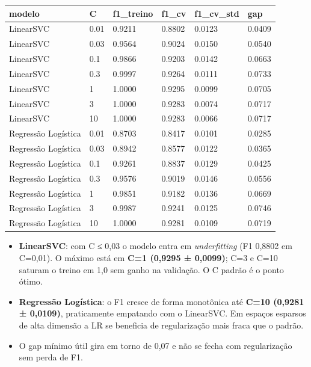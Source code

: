 \documentclass[
  brazilian,
  11pt,
]{article}
\newcounter{none} %
\providecommand{\tightlist}{%
  \setlength{\itemsep}{0pt}\setlength{\parskip}{0pt}}
\begin{document}
{\def\LTcaptype{none} %
\begin{longtable}[]{@{}llllll@{}}
\toprule\noalign{}
modelo & C & f1\_treino & f1\_cv & f1\_cv\_std & gap \\
\midrule\noalign{}
\endhead
\bottomrule\noalign{}
\endlastfoot
LinearSVC & 0.01 & 0.9211 & 0.8802 & 0.0123 & 0.0409 \\
LinearSVC & 0.03 & 0.9564 & 0.9024 & 0.0150 & 0.0540 \\
LinearSVC & 0.1 & 0.9866 & 0.9203 & 0.0142 & 0.0663 \\
LinearSVC & 0.3 & 0.9997 & 0.9264 & 0.0111 & 0.0733 \\
LinearSVC & 1 & 1.0000 & 0.9295 & 0.0099 & 0.0705 \\
LinearSVC & 3 & 1.0000 & 0.9283 & 0.0074 & 0.0717 \\
LinearSVC & 10 & 1.0000 & 0.9283 & 0.0066 & 0.0717 \\
Regressão Logística & 0.01 & 0.8703 & 0.8417 & 0.0101 & 0.0285 \\
Regressão Logística & 0.03 & 0.8942 & 0.8577 & 0.0122 & 0.0365 \\
Regressão Logística & 0.1 & 0.9261 & 0.8837 & 0.0129 & 0.0425 \\
Regressão Logística & 0.3 & 0.9576 & 0.9019 & 0.0146 & 0.0556 \\
Regressão Logística & 1 & 0.9851 & 0.9182 & 0.0136 & 0.0669 \\
Regressão Logística & 3 & 0.9987 & 0.9241 & 0.0125 & 0.0746 \\
Regressão Logística & 10 & 1.0000 & 0.9281 & 0.0109 & 0.0719 \\
\end{longtable}
}

\begin{itemize}
\tightlist
\item
  \textbf{LinearSVC}: com C ≤ 0,03 o modelo entra em \emph{underfitting} (F1 0,8802 em C=0,01). O máximo está em \textbf{C=1 (0,9295 ± 0,0099)}; C=3 e C=10 saturam o treino em 1,0 sem ganho na validação. O C padrão é o ponto ótimo.
\item
  \textbf{Regressão Logística}: o F1 cresce de forma monotônica até \textbf{C=10 (0,9281 ± 0,0109)}, praticamente empatando com o LinearSVC. Em espaços esparsos de alta dimensão a LR se beneficia de regularização mais fraca que o padrão.
\item
  O gap mínimo útil gira em torno de 0,07 e não se fecha com regularização sem perda de F1.
\end{itemize}
\end{document}
